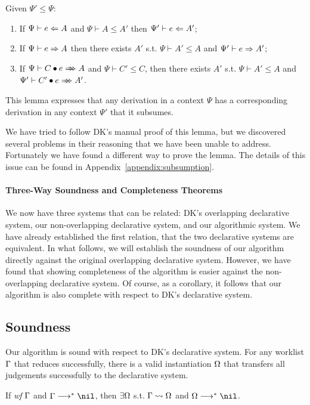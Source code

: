 \begin{lemma}[Subsumption]\label{lem:subsumption}
Given $\Psi' \le \Psi$:
\begin{enumerate}
    \item If $\Psi \vdash e \Leftarrow A$ and $\Psi \vdash A \le A'$ then $\Psi' \vdash e \Leftarrow A'$;
    \item If $\Psi \vdash e \Rightarrow A$ then there exists
        $A'$ s.t. $\Psi \vdash A' \le A$ and $\Psi' \vdash e \Rightarrow A'$;
    \item If $\Psi \vdash \appInf{C}{e}{A}$ and $\Psi \vdash C' \le C$,
        then there exists $A'$ s.t. $\Psi \vdash A' \le A$ and $\Psi' \vdash \appInf{C'}{e}{A'}$.
\end{enumerate}
\end{lemma}
This lemma expresses that any derivation in a context $\Psi$ has a corresponding derivation in any context
$\Psi'$ that it subsumes.

We have tried to follow DK's manual proof of this lemma,
but we discovered several problems in their reasoning that we have been unable to address.
Fortunately we have found a different way to prove the lemma.
The details of this issue can be found in Appendix~\ref{appendix:subsumption}.

\paragraph{Three-Way Soundness and Completeness Theorems}
We now have three systems that can be related: DK's overlapping declarative system,
our non-overlapping declarative system, and our algorithmic system.
We have already established the first relation, that the two declarative
systems are equivalent.
In what follows, we will establish the soundness of our algorithm directly
against the original overlapping declarative system. However, we have found
that showing completeness of the algorithm is easier against the
non-overlapping declarative system. Of course, as a corollary, it follows that
our algorithm is also complete with respect to DK's declarative system.

\subsection{Soundness}

Our algorithm is sound with respect to DK's declarative system.
For any worklist $\Gamma$ that reduces successfully,
there is a valid instantiation $\Omega$ that transfers all judgements successfully to the declarative system.
\begin{theorem}[Soundness]
If \emph{wf }$\Gamma$ and $\Gm \redto \nil$, then $\exists \Omega$ s.t. $\Gamma\rightsquigarrow\Omega$ and $\Om\redto\nil$.
\end{theorem}

